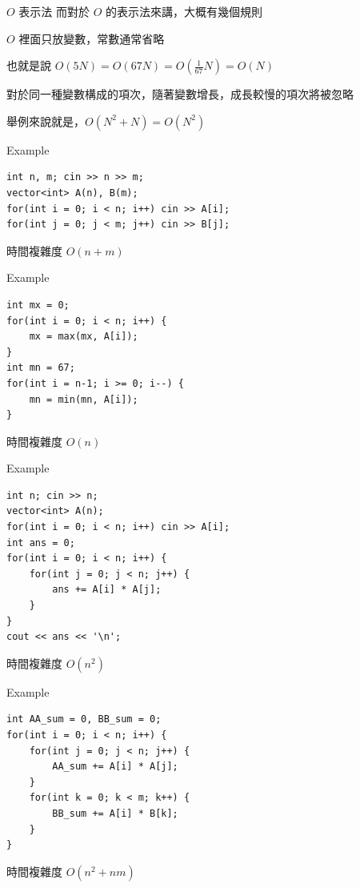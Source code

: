 \begin{frame}{$O$ 表示法}
    而對於 $O$ 的表示法來講，大概有幾個規則

    \begin{property}[忽略常數]
        $O$ 裡面只放變數，常數通常省略

        也就是說 $O(5 N) = O(67 N) = O(\frac{1}{67} N) = O(N)$
    \end{property}\pause

    \begin{property}[忽略成長較慢項]
        對於同一種變數構成的項次，隨著變數增長，成長較慢的項次將被忽略

        舉例來說就是，$O(N^2 + N) = O(N^2)$
    \end{property}
\end{frame}

\begin{frame}[fragile]{Example}
\begin{lstlisting}
int n, m; cin >> n >> m;
vector<int> A(n), B(m);
for(int i = 0; i < n; i++) cin >> A[i];
for(int j = 0; j < m; j++) cin >> B[j];
\end{lstlisting}

時間複雜度 $O(n + m)$
\end{frame}

\begin{frame}[fragile]{Example}
\begin{lstlisting}
int mx = 0;
for(int i = 0; i < n; i++) {
    mx = max(mx, A[i]);
}
int mn = 67;
for(int i = n-1; i >= 0; i--) {
    mn = min(mn, A[i]);
}
\end{lstlisting}

時間複雜度 $O(n)$
\end{frame}

\begin{frame}[fragile]{Example}
\begin{lstlisting}
int n; cin >> n;
vector<int> A(n);
for(int i = 0; i < n; i++) cin >> A[i];
int ans = 0;
for(int i = 0; i < n; i++) {
    for(int j = 0; j < n; j++) {
        ans += A[i] * A[j];
    }
}
cout << ans << '\n';
\end{lstlisting}

時間複雜度 $O(n^2)$
\end{frame}

\begin{frame}[fragile]{Example}
\begin{lstlisting}
int AA_sum = 0, BB_sum = 0;
for(int i = 0; i < n; i++) {
    for(int j = 0; j < n; j++) {
        AA_sum += A[i] * A[j];
    }
    for(int k = 0; k < m; k++) {
        BB_sum += A[i] * B[k];
    }
}
\end{lstlisting}

時間複雜度 $O(n^2 + nm)$
\end{frame}

